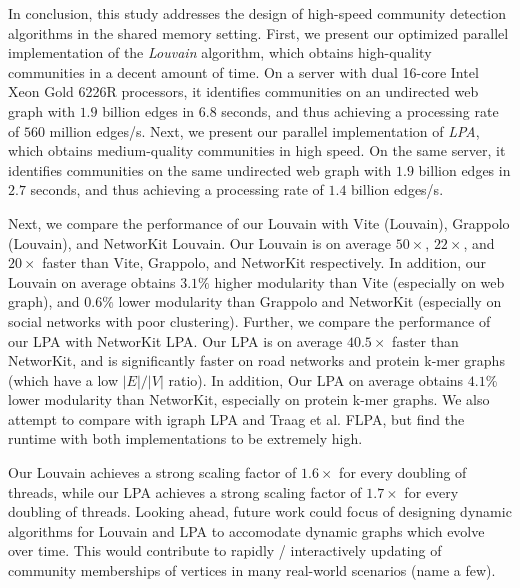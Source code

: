 In conclusion, this study addresses the design of high-speed community detection algorithms in the shared memory setting. First, we present our optimized parallel implementation of the \textit{Louvain} algorithm, which obtains high-quality communities in a decent amount of time. On a server with dual 16-core Intel Xeon Gold 6226R processors, it identifies communities on an undirected web graph with $1.9$ billion edges in $6.8$ seconds, and thus achieving a processing rate of $560$ million edges/s. Next, we present our parallel implementation of \textit{LPA}, which obtains medium-quality communities in high speed. On the same server, it identifies communities on the same undirected web graph with $1.9$ billion edges in $2.7$ seconds, and thus achieving a processing rate of $1.4$ billion edges/s.

Next, we compare the performance of our Louvain with Vite (Louvain), Grappolo (Louvain), and NetworKit Louvain. Our Louvain is on average $50\times$, $22\times$, and $20\times$ faster than Vite, Grappolo, and NetworKit respectively. In addition, our Louvain on average obtains $3.1\%$ higher modularity than Vite (especially on web graph), and $0.6\%$ lower modularity than Grappolo and NetworKit (especially on social networks with poor clustering). Further, we compare the performance of our LPA with NetworKit LPA. Our LPA is on average $40.5\times$ faster than NetworKit, and is significantly faster on road networks and protein k-mer graphs (which have a low $|E|/|V|$ ratio). In addition, Our LPA on average obtains $4.1\%$ lower modularity than NetworKit, especially on protein k-mer graphs. We also attempt to compare with igraph LPA and Traag et al. FLPA, but find the runtime with both implementations to be extremely high.

Our Louvain achieves a strong scaling factor of $1.6\times$ for every doubling of threads, while our LPA achieves a strong scaling factor of $1.7\times$ for every doubling of threads. Looking ahead, future work could focus of designing dynamic algorithms for Louvain and LPA to accomodate dynamic graphs which evolve over time. This would contribute to rapidly / interactively updating of community memberships of vertices in many real-world scenarios (name a few).

